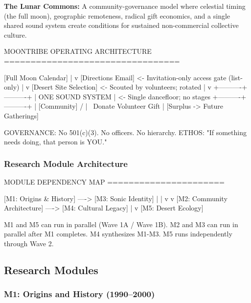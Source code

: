 \documentclass[11pt,letterpaper]{article}
\begin{document}
\textbf{The Lunar Commons:} A community-governance model where celestial timing (the full moon), geographic remoteness, radical gift economics, and a single shared sound system create conditions for sustained non-commercial collective culture.

\begin{asciibox}
MOONTRIBE OPERATING ARCHITECTURE
=================================

      [Full Moon Calendar]
             |
             v
    [Directions Email]          <- Invitation-only access gate
        (list-only)
             |
             v
   [Desert Site Selection]      <- Scouted by volunteers; rotated
             |
             v
  +----------+----------+
  |   ONE SOUND SYSTEM  |      <- Single dancefloor; no stages
  +----------+----------+
             |
        [Community]
      /       |       \
  Donate   Volunteer  Gift
             |
    [Surplus -> Future Gatherings]

GOVERNANCE: No 501(c)(3). No officers. No hierarchy.
ETHOS: "If something needs doing, that person is YOU."
\end{asciibox}

\subsubsection{Research Module Architecture}

\begin{asciibox}
MODULE DEPENDENCY MAP
======================

  [M1: Origins & History]  ---->  [M3: Sonic Identity]
            |                              |
            v                              v
  [M2: Community Architecture]  ---->  [M4: Cultural Legacy]
                    |
                    v
         [M5: Desert Ecology]

M1 and M5 can run in parallel (Wave 1A / Wave 1B).
M2 and M3 can run in parallel after M1 completes.
M4 synthesizes M1-M3. M5 runs independently through Wave 2.
\end{asciibox}

\subsection{Research Modules}

\subsubsection{M1: Origins and History (1990--2000)}
\end{document}
